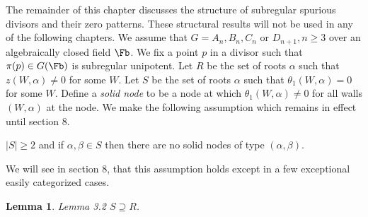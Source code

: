 \documentclass{memo-l}
\newtheorem{lemma}[theorem]{Lemma}
\theoremstyle{definition}
\theoremstyle{remark}
\numberwithin{section}{chapter}
\numberwithin{equation}{chapter}
\begin{document}
The remainder of this chapter discusses the structure of subregular spurious
divisors and their zero patterns.  These structural results will not be
used in any of the following chapters.  We assume that $G = A_{n}, B_{n},
C_{n}$ or $D_{n+1}, n \ge  3$ over an algebraically closed field $\Fb$.
We fix a point $p$ in a divisor such that ${\pi}(p) \in G(\Fb)$ is
subregular unipotent.  Let $R$ be the set of roots ${\alpha}$ such that
$z(W,{\alpha})\ne 0$ for some $W$.  Let $S$ be the set of roots ${\alpha}$
such that ${\theta}_{1}(W,{\alpha}) = 0$ for some $W$.  Define a {\it solid
node} to be a node at which ${\theta}_{1}(W,{\alpha})\ne 0$ for all walls
$(W,{\alpha})$ at the node.  We make the following assumption which remains
in effect until section $8$.


 $\vert S\vert \ge 2$ and if ${\alpha},
{\beta} \in S$ then there are no solid nodes of type
$({\alpha},{\beta})$.
\enddefinition

   We will see in section $8$, that this assumption holds except in a few
exceptional easily categorized cases.

\medpagebreak

\begin{lemma}{Lemma 3.2}  $S {\supseteq} R$.
\end{lemma}

\medpagebreak
\end{document}
